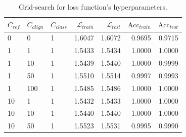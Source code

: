 \small
\begingroup
\renewcommand\arraystretch{0.85}
\begin{table}[!htb]
    \small
    \caption{Grid-search for loss function's hyperparameters.}
    \label{tab:phm_hyperparameters}
    \vspace{-1em}
    \begin{center}
    \begin{tabular}{l@{\hskip 0.5em}l@{\hskip 0.5em}l|r@{\hskip 0.5em}r@{\hskip 0.5em}r@{\hskip 0.5em}r}
    \toprule
    $C_{ref}$ &  $C_{align}$ &  $C_{class}$ &  $\mathcal{L}_{train}$ &  $\mathcal{L}_ {test}$ &  $\text{Acc}_{train}$ &  $\text{Acc}_{test}$ \\
    \midrule
    0 &             0 &                   1 &     1.6047 &    1.6072 &     0.9695 &    0.9715 \\
    1 &               1 &                    1 &      1.5433 &     1.5434 &     1.0000 &    1.0000 \\
    1 &              10 &                    1 &      1.5439 &     1.5440 &     1.0000 &    0.9999 \\
    1 &              50 &                    1 &      1.5510 &     1.5514 &     0.9997 &    0.9993 \\
    1 &             100 &                    1 &      1.5485 &     1.5486 &     1.0000 &    1.0000 \\
    10 &               1 &                    1 &      1.5432 &     1.5433 &     1.0000 &    1.0000 \\
    10 &              10 &                    1 &      1.5440 &     1.5440 &     1.0000 &    1.0000 \\
    10 &              50 &                    1 &      1.5523 &     1.5531 &     0.9995 &    0.9990 \\

\end{tabular}
\end{center}
\end{table}
